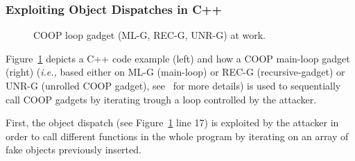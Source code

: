 \subsubsection{Exploiting Object Dispatches in C++}
\label{Exploiting Polymorphism Weaknesses}
 \begin{figure}[!h]
   \vspace{-.37cm}
   \centering
\vspace{-2.6cm}
\caption{COOP loop gadget (ML-G, REC-G, UNR-G) at work.}
\label{Code example used to illustrate how a COOP loop gadget works}
\end{figure}

Figure~\ref{Code example used to illustrate how a COOP loop gadget works}
depicts a C++ code example (left) and how a COOP main-loop gadget (right) 
(\textit{i.e.,} based either on ML-G (main-loop) or REC-G (recursive-gadget) or UNR-G (unrolled COOP gadget), 
see~\cite{crane:readactor++} for more details) is used to sequentially call COOP gadgets by iterating trough 
a loop controlled by the attacker.

First, the object dispatch (see Figure~\ref{Code example used to illustrate how a COOP loop gadget works} line 17) is exploited by the attacker
in order to call different functions in the whole program by iterating on an array of fake objects previously inserted.

